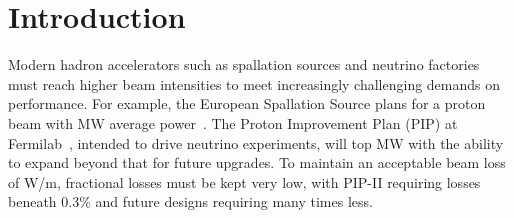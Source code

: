 \documentclass[aps,prstab,twocolumn, groupedaddress]{revtex4-1}
\begin{document}
\pacs{}

\maketitle



\section{Introduction}


%

Modern hadron accelerators such as spallation sources and neutrino factories must reach higher beam intensities to meet increasingly challenging demands on performance. For example, the European Spallation Source plans for a proton beam with \unit[5]{MW} average power~\cite{ess_report}. The Proton Improvement Plan (PIP) at Fermilab~\cite{pipii}, intended to drive neutrino experiments, will top \unit[1]{MW} with the ability to expand beyond that for future upgrades. To maintain an acceptable beam loss of \unit[1]{W/m}, fractional losses must be kept very low, with PIP-II requiring losses beneath $0.3\%$ and future designs requiring many times less.
\end{document}
